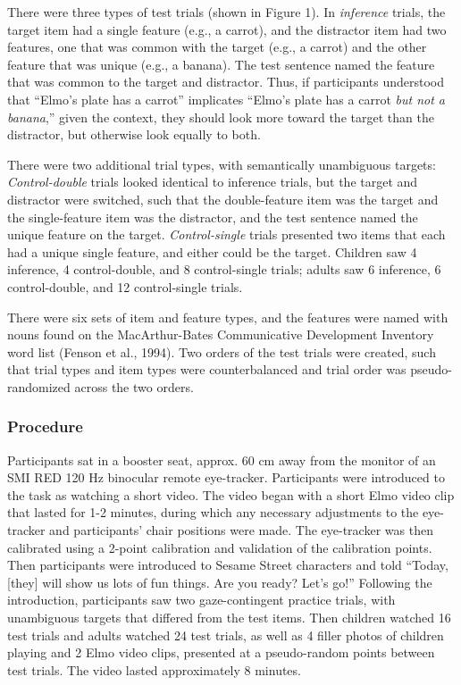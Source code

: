 \documentclass[a4paper,man,apacite,floatsintext]{apa6}
\begin{document}
There were three types of test trials (shown in Figure 1). In
\emph{inference} trials, the target item had a single feature (e.g., a
carrot), and the distractor item had two features, one that was common
with the target (e.g., a carrot) and the other feature that was unique
(e.g., a banana). The test sentence named the feature that was common to
the target and distractor. Thus, if participants understood that
``Elmo's plate has a carrot'' implicates ``Elmo's plate has a carrot
\emph{but not a banana},'' given the context, they should look more
toward the target than the distractor, but otherwise look equally to
both.

There were two additional trial types, with semantically unambiguous
targets: \emph{Control-double} trials looked identical to inference
trials, but the target and distractor were switched, such that the
double-feature item was the target and the single-feature item was the
distractor, and the test sentence named the unique feature on the
target. \emph{Control-single} trials presented two items that each had a
unique single feature, and either could be the target. Children saw 4
inference, 4 control-double, and 8 control-single trials; adults saw 6
inference, 6 control-double, and 12 control-single trials.

There were six sets of item and feature types, and the features were
named with nouns found on the MacArthur-Bates Communicative Development
Inventory word list (Fenson et al., 1994). Two orders of the test trials
were created, such that trial types and item types were counterbalanced
and trial order was pseudo-randomized across the two orders.

\subsubsection{Procedure}\label{procedure}

Participants sat in a booster seat, approx. 60 cm away from the monitor
of an SMI RED 120 Hz binocular remote eye-tracker. Participants were
introduced to the task as watching a short video. The video began with a
short Elmo video clip that lasted for 1-2 minutes, during which any
necessary adjustments to the eye-tracker and participants' chair
positions were made. The eye-tracker was then calibrated using a 2-point
calibration and validation of the calibration points. Then participants
were introduced to Sesame Street characters and told ``Today, {[}they{]}
will show us lots of fun things. Are you ready? Let's go!'' Following
the introduction, participants saw two gaze-contingent practice trials,
with unambiguous targets that differed from the test items. Then
children watched 16 test trials and adults watched 24 test trials, as
well as 4 filler photos of children playing and 2 Elmo video clips,
presented at a pseudo-random points between test trials. The video
lasted approximately 8 minutes.
\end{document}
